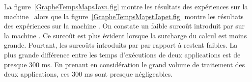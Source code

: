 
La figure~\ref{GrapheTempsMapsJava.fig} montre les r\'esultats des exp\'eriences sur la machine \ alors que la figure~\ref{GrapheTempsMapstJapet.fig} montre les r\'esultats des exp\'eriences sur la machine . On constate un faible surco\^ut
introduit par  sur la machine . Ce surco\^ut est plus \'evident lorsque la surcharge du calcul est moins grande. Pourtant, les surco\^uts introduits par  par rapport \`a  restent faibles. La plus grande diff\'erence entre les temps d'ex\'ecutions de deux applications est de presque 300 ms. En prenant en consid\'eration le grand volume de traitement des deux applications, ces 300 ms sont presque n\'egligeables.




